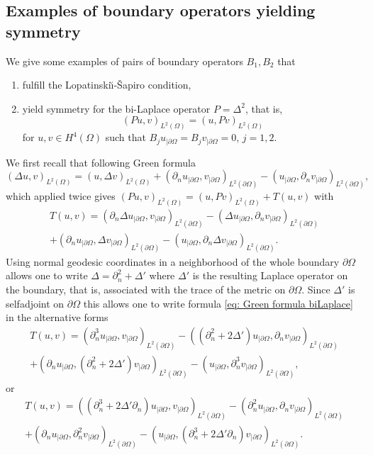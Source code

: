 \documentclass[JEP,XML,SOM,Unicode,published]{cedram}
\theoremstyle{plain}
\theoremstyle{definition}
\newcommand{\LS}{Lopatinski\u{\i}-\v{S}apiro\xspace}
\newcommand{\nhd}{neighborhood\xspace}
\newcommand{\inp}[2]{(#1, #2)}
\newcommand{\bd}{\ensuremath{_{|\partial\Omega}}}
\begin{document}
\subsection{Examples of boundary operators yielding symmetry}
\label{sec: Examples of boundary operators yielding symmetry}

We give some examples of pairs of boundary operators $B_1, B_2$ that
\begin{enumerate}
\item
fulfill the
\LS condition,
\item yield symmetry for the bi-Laplace operator $P = \Delta^2$, that is,
\begin{equation*}
\inp{P u }{v}_{L^2(\Omega)} = \inp{u }{P v}_{L^2(\Omega)}
\end{equation*}
for $u,v\in H^4(\Omega)$ such that $B_j u_{|\partial\Omega} = B_j
v_{|\partial\Omega} =0$, $j=1,2$.
\end{enumerate}

We first recall that following Green formula
\begin{equation}
\label{eq: Green formula}
\inp{\Delta u }{v}_{L^2(\Omega)}
= \inp{u }{\Delta v}_{L^2(\Omega)}
+ \inp{\partial_{n} u\bd}{v\bd}_{L^2(\partial\Omega)}
- \inp{u\bd}{\partial_{n} v\bd}_{L^2(\partial\Omega)},
\end{equation}
which applied twice gives
$\inp{P u }{v}_{L^2(\Omega)}
= \inp{u }{P v}_{L^2(\Omega)} + T(u,v)$
with
\begin{multline}
\label{eq: Green formula biLaplace}
T(u,v) = \inp{\partial_{n} \Delta u\bd}{v\bd}_{L^2(\partial\Omega)}
- \inp{\Delta u\bd}{\partial_{n} v\bd}_{L^2(\partial\Omega)}\\
+ \inp{\partial_{n} u\bd}{\Delta v\bd}_{L^2(\partial\Omega)}
- \inp{u\bd}{\partial_{n} \Delta v\bd}_{L^2(\partial\Omega)}.
\end{multline}
Using normal geodesic coordinates in a \nhd of the whole boundary
$\partial\Omega$ allows one to write $\Delta = \partial_n^2 + \Delta'$
where $\Delta'$ is the resulting Laplace operator on the boundary,
that is, associated with the trace of the metric on
$\partial\Omega$. Since $\Delta'$ is selfadjoint on $\partial\Omega$
this allows one to write formula \eqref{eq: Green formula biLaplace}
in the alternative forms
\begin{multline}
\label{eq: Green formula biLaplace-bis}
T(u,v) = \inp{\partial_{n}^3 u\bd}{v\bd}_{L^2(\partial\Omega)}
- \inp{(\partial_{n}^2 + 2 \Delta') u\bd}{\partial_{n}v\bd}_{L^2(\partial\Omega)}
\\
+ \inp{\partial_{n} u\bd}{ (\partial_{n}^2 + 2 \Delta')v\bd}_{L^2(\partial\Omega)}
- \inp{u\bd}{\partial_{n}^3 v\bd}_{L^2(\partial\Omega)},
\end{multline}
or
\begin{multline}
\label{eq: Green formula biLaplace-ter}
T(u,v) =
\inp{(\partial_{n}^3
+ 2 \Delta'\partial_{n}) u\bd}{v\bd}_{L^2(\partial\Omega)}
- \inp{\partial_{n}^2 u\bd}{\partial_{n}v\bd}_{L^2(\partial\Omega)}
\\
+ \inp{\partial_{n} u\bd}{ \partial_{n}^2 v\bd}_{L^2(\partial\Omega)}
- \inp{u\bd}{(\partial_{n}^3
+ 2 \Delta'\partial_{n}) v\bd}_{L^2(\partial\Omega)}.
\end{multline}
\end{document}
